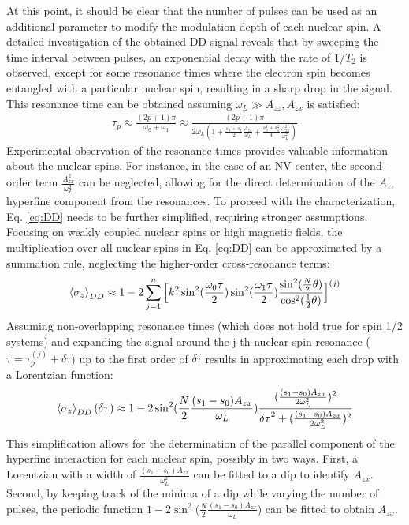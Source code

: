 \documentclass[%
 reprint,
superscriptaddress,
 amsmath,amssymb,
 aps,
]{revtex4-2}
\begin{document}
At this point, it should be clear that the number of pulses can be used as an additional parameter to modify the modulation depth of each nuclear spin.
A detailed investigation of the obtained DD signal reveals that by sweeping the time interval between pulses, an exponential decay with the rate of $1/T_2$ is observed, except for some resonance times where the electron spin becomes entangled with a particular nuclear spin, resulting in a sharp drop in the signal.
This resonance time can be obtained assuming $\omega_L \gg A_{zz}, A_{zx}$ is satisfied: 
\begin{gather} \label{eq:resonance}
	\tau_p \approx  \frac{(2p+1) \pi}{\omega_0 + \omega_1} \approx \frac{(2p+1)\pi}{2\omega_L(1+\frac{s_0+s_1}{2} \frac{A_{zz}}{\omega_L}+ \frac{s_0^2+s_1^2}{4}\frac{A_{zx}^2}{\omega_L^2})}
\end{gather}
Experimental observation of the resonance times provides valuable information about the nuclear spins.
For instance, in the case of an NV center, the second-order term $\frac{A_{zx}^2}{\omega_L^2}$ can be neglected, allowing for the direct determination of the $A_{zz}$ hyperfine component from the resonances.
To proceed with the characterization, Eq. \ref{eq:DD} needs to be further simplified, requiring stronger assumptions.
Focusing on weakly coupled nuclear spins or high magnetic fields, the multiplication over all nuclear spins in Eq. \ref{eq:DD} can be approximated by a summation rule, neglecting the higher-order cross-resonance terms:
\small
\begin{gather}
	\expval{\sigma_z}_{DD} \approx 1 -2
	\sum_{j=1}^n \Big[ k^2 	 \sin^2(\frac{\omega_0 \tau}{2}) \sin^2(\frac{\omega_1 \tau}{2}) \frac{\sin^2(\frac{N}{2} \theta)}{\cos^2(\frac{1}{2}\theta)}  \Big]^{(j)} %
	\label{eq:approx_DD}
\end{gather}
\normalsize
Assuming non-overlapping resonance times (which does not hold true for spin 1/2 systems) and expanding the signal around the j-th nuclear spin resonance ($\tau = \tau_p^{(j)}+\delta \tau$) up to the first order of $\delta \tau$ results in approximating each drop with a Lorentzian function:
\small
\begin{gather}
	\expval{\sigma_z}_{DD} (\delta \tau ) \approx 1 -2\sin^2(\frac{N}{2}\frac{(s_1-s_0)A_{zx}}{\omega_L}) \frac{(\frac{(s_1-s_0)A_{zx}}{2\omega_L^2})^2}{{\delta \tau}^2 +(\frac{(s_1-s_0)A_{zx}}{2\omega_L^2})^2}
\end{gather}
\normalsize
This simplification allows for the determination of the parallel component of the hyperfine interaction for each nuclear spin, possibly in two ways. First, a Lorentzian with a width of $\frac{(s_1-s_0) A_{zx}}{\omega_L^2}$ can be fitted to a dip to identify $A_{zx}$. Second, by keeping track of the minima of a dip while varying the number of pulses, the periodic function $1 - 2 \sin^2\big(\frac{N}{2}\frac{(s_1-s_0) A_{zx}}{\omega_L}\big)$ can be fitted to obtain $A_{zx}$.
\end{document}

